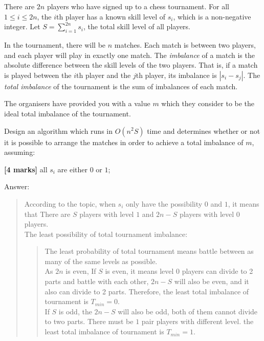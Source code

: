 \documentclass{article}
\begin{document}
\setcounter{question}{3}

\begin{Question}
There are $2n$ players who have signed up to a chess tournament. For all $1 \le i \le 2n$, the $i$th player has a known skill level of $s_i$, which is a non-negative integer. Let $S = \sum_{i=1}^{2n} s_i$, the total skill level of all players.

In the tournament, there will be $n$ matches. Each match is between two players, and each player will play in exactly one match. The \textit{imbalance} of a match is the absolute difference between the skill levels of the two players. That is, if a match is played between the $i$th player and the $j$th player, its imbalance is $|s_i - s_j|$. The \textit{total imbalance} of the tournament is the sum of imbalances of each match.

The organisers have provided you with a value $m$ which they consider to be the ideal total imbalance of the tournament.

Design an algorithm which runs in $O(n^2S)$ time and determines whether or not it is possible to arrange the matches in order to achieve a total imbalance of $m$, assuming:

\begin{Subquestion}
\textbf{[4 marks]} all $s_i$ are either $0$ or $1$;

\begin{answer}
Answer:
\begin{quote}
    According to the topic, when $s_i$ only have the possibility $0$ and $1$, it means that There are $S$ players with level $1$ and $2n-S$ players with level $0$ players.\\
    The least possibility of total tournament imbalance:
\begin{quote}
    The least probability of total tournament means battle between as many of the same levels as possible.\\
    As $2n$ is even, If $S$ is even, it means level $0$ players can divide to 2 parts and battle with each other, $2n-S$ will also be even, and it also can divide to 2 parts. Therefore, the least total imbalance of tournament is $T_{min} = 0$.\\
    If $S$ is odd, the $2n-S$ will also be odd, both of them cannot divide to two parts. There must be $1$ pair players with different level. the least total imbalance of tournament is $T_{min} = 1$.
    

\end{quote}
\end{quote}
\end{answer}
\end{Subquestion}
\end{Question}
\end{document}
